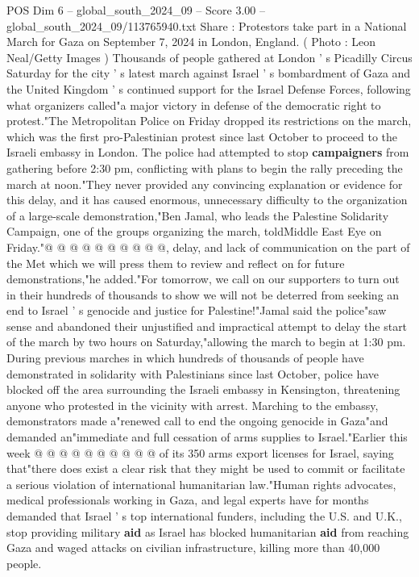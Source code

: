 \begin{textsample}{POS Dim 6 – global\_south\_2024\_09 – Score 3.00 – global\_south\_2024\_09/113765940.txt}  \label{ex:f6_pos_439}
Share : Protestors take part in a National March for Gaza on September 7, 2024 in London, England. ( Photo : Leon Neal/Getty Images ) Thousands of people gathered at London ' s Picadilly Circus Saturday for the city ' s latest march against Israel ' s bombardment of Gaza and the United Kingdom ' s continued support for the Israel Defense Forces, following what organizers called"a major victory in defense of the democratic right to protest."The Metropolitan Police on Friday dropped its restrictions on the march, which was the first pro-Palestinian protest since last October to proceed to the Israeli embassy in London.
The police had attempted to stop \textbf{campaigners} from gathering before 2:30 pm, conflicting with plans to begin the rally preceding the march at noon."They never provided any convincing explanation or evidence for this delay, and it has caused enormous, unnecessary difficulty to the organization of a large-scale demonstration,"Ben Jamal, who leads the Palestine Solidarity Campaign, one of the groups organizing the march, toldMiddle East Eye on Friday."@ @ @ @ @ @ @ @ @ @, delay, and lack of communication on the part of the Met which we will press them to review and reflect on for future demonstrations,"he added."For tomorrow, we call on our supporters to turn out in their hundreds of thousands to show we will not be deterred from seeking an end to Israel ' s genocide and justice for Palestine!"Jamal said the police"saw sense and abandoned their unjustified and impractical attempt to delay the start of the march by two hours on Saturday,"allowing the march to begin at 1:30 pm.
During previous marches in which hundreds of thousands of people have demonstrated in solidarity with Palestinians since last October, police have blocked off the area surrounding the Israeli embassy in Kensington, threatening anyone who protested in the vicinity with arrest.
Marching to the embassy, demonstrators made a"renewed call to end the ongoing genocide in Gaza"and demanded an"immediate and full cessation of arms supplies to Israel."Earlier this week @ @ @ @ @ @ @ @ @ @ of its 350 arms export licenses for Israel, saying that"there does exist a clear risk that they might be used to commit or facilitate a serious violation of international humanitarian law."Human rights advocates, medical professionals working in Gaza, and legal experts have for months demanded that Israel ' s top international funders, including the U.S. and U.K., stop providing military \textbf{aid} as Israel has blocked humanitarian \textbf{aid} from reaching Gaza and waged attacks on civilian infrastructure, killing more than 40,000 people.

\end{textsample}
